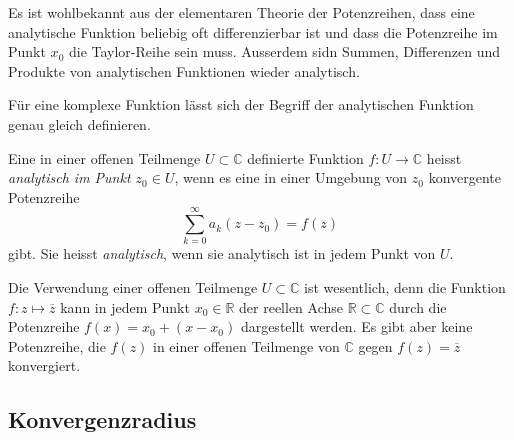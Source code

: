 Es ist wohlbekannt aus der elementaren Theorie der Potenzreihen, dass
eine analytische Funktion beliebig oft differenzierbar ist und dass
die Potenzreihe im Punkt $x_0$ die Taylor-Reihe sein muss.
Ausserdem sidn Summen, Differenzen und Produkte von analytischen Funktionen
wieder analytisch.

Für eine komplexe Funktion lässt sich der Begriff der
analytischen Funktion genau gleich definieren.

\begin{definition}
Eine in einer offenen Teilmenge $U\subset \mathbb{C}$ definierte Funktion
$f\colon U\to\mathbb{C}$ heisst {\em analytisch im Punkt $z_0\in U$}, wenn
es eine in einer Umgebung von $z_0$ konvergente Potenzreihe
\[
\sum_{k=0}^\infty a_k(z-z_0) = f(z)
\]
gibt.
Sie heisst {\em analytisch}, wenn sie analytisch ist in jedem Punkt von $U$.
\end{definition}

Die Verwendung einer offenen Teilmenge $U\subset\mathbb{C}$ ist wesentlich,
denn die Funktion $f\colon z\mapsto \overline{z}$ kann in jedem Punkt
$x_0\in\mathbb{R}$
der reellen Achse $\mathbb{R}\subset\mathbb{C}$ durch die Potenzreihe 
$f(x) = x_0 + (x-x_0)$ dargestellt werden.
Es gibt aber keine Potenzreihe, die $f(z)$ in einer offenen Teilmenge
von $\mathbb{C}$ gegen $f(z)=\overline{z}$ konvergiert.

%
%
\subsection{Konvergenzradius
\label{buch:funktionentheorie:subsection:konvergenzradius}}



